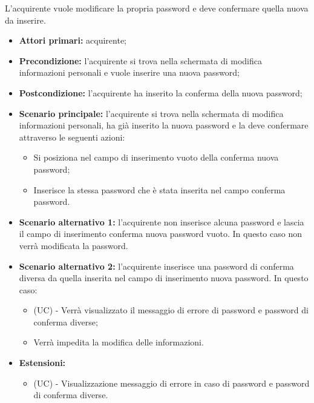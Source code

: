 L'acquirente vuole modificare la propria password e deve confermare quella nuova da inserire.
\begin{itemize}
    \item \textbf{Attori primari:} acquirente;
    \item \textbf{Precondizione:} l'acquirente si trova nella schermata di modifica informazioni personali e vuole inserire una nuova password;
    \item \textbf{Postcondizione:} l'acquirente ha inserito la conferma della nuova password;
    \item \textbf{Scenario principale:} l'acquirente si trova nella schermata di modifica informazioni personali, ha già inserito la nuova password e la deve confermare attraverso le seguenti azioni:
        \begin{itemize}
            \item Si posiziona nel campo di inserimento vuoto della conferma nuova password;
            \item Inserisce la stessa password che è stata inserita nel campo conferma password.
        \end{itemize}
    \item \textbf{Scenario alternativo 1:} l'acquirente non inserisce alcuna password e lascia il campo di inserimento conferma nuova password vuoto. In questo caso non verrà modificata la password.
    \item \textbf{Scenario alternativo 2:} l'acquirente inserisce una password di conferma diversa da quella inserita nel campo di inserimento nuova password. In questo caso:
    \begin{itemize}
        \item (UC) - Verrà visualizzato il messaggio di errore di password e password di conferma diverse;
        \item Verrà impedita la modifica delle informazioni.
    \end{itemize}
    \item \textbf{Estensioni:}
    \begin{itemize}
        \item (UC) - Visualizzazione messaggio di errore in caso di password e password di conferma diverse.
    \end{itemize}
\end{itemize}

